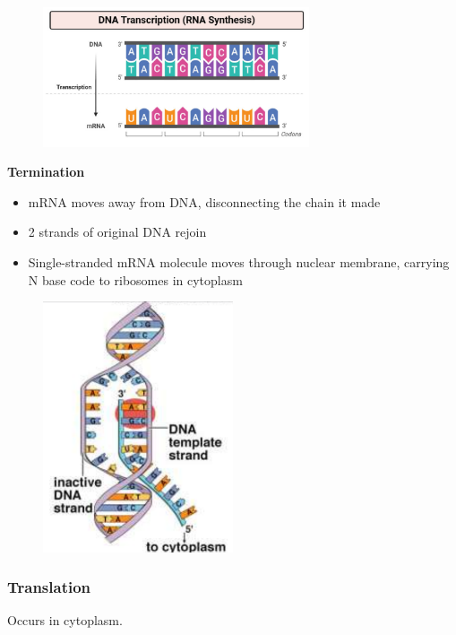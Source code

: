 \documentclass[a4paper,12pt]{article}
\begin{document}
\begin{figure}[H]
    \centering
    \includegraphics[width=0.7\textwidth]{transcription2}
\end{figure}

\textbf{Termination}
\begin{itemize}
    \item{mRNA moves away from DNA, disconnecting the chain it made}
    \item{2 strands of original DNA rejoin}
    \item{Single-stranded mRNA molecule moves through nuclear membrane, carrying N base code to ribosomes in cytoplasm}
\end{itemize}

\begin{figure}[H]
    \centering
    \includegraphics[width=0.50\textwidth]{transcription}
\end{figure}

\subsubsection{Translation}
Occurs in cytoplasm.
\end{document}

